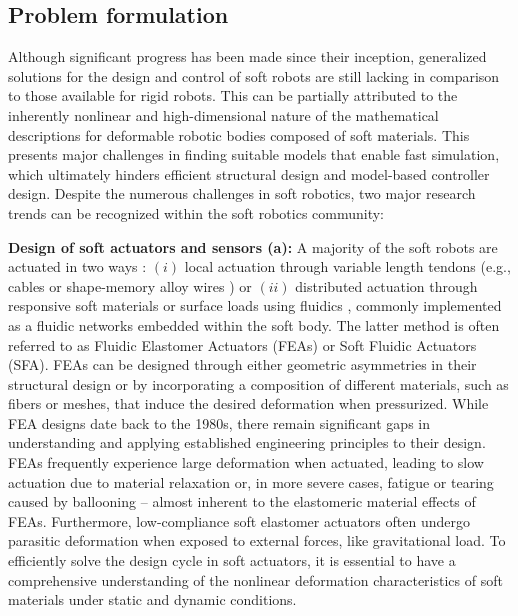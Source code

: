 \subsection{Problem formulation}
Although significant progress has been made since their inception, generalized solutions for the design and control of soft robots are still lacking in comparison to those available for rigid robots. This can be partially attributed to the inherently nonlinear and high-dimensional nature of the mathematical descriptions for deformable robotic bodies composed of soft materials. This presents major challenges in finding suitable models that enable fast simulation, which ultimately hinders efficient structural design and model-based controller design. Despite the numerous challenges in soft robotics, two major research trends can be recognized within the soft robotics community:

\textbf{Design of soft actuators and sensors (a):} A majority of the soft robots are actuated in two ways \cite{Rus2015}: $(i)$ local actuation through variable length tendons (e.g., cables \cite{Renda2018} or shape-memory alloy wires \cite{An2023Jan}) or $(ii)$ distributed actuation through responsive soft materials \cite{Vantomme2021} or surface loads using fluidics \cite{Fras2018Oct,Hawkes2017,Falkenhahn2015}, commonly implemented as a fluidic networks embedded within the soft body. The latter method is often referred to as Fluidic Elastomer Actuators (FEAs) or Soft Fluidic Actuators (SFA). FEAs can be designed through either geometric asymmetries in their structural design or by incorporating a composition of different materials, such as fibers or meshes, that induce the desired deformation when pressurized. While FEA designs date back to the 1980s, there remain significant gaps in understanding and applying established engineering principles to their design. FEAs frequently experience large deformation when actuated, leading to slow actuation due to material relaxation or, in more severe cases, fatigue or tearing caused by ballooning \cite{Marchese2015} -- almost inherent to the elastomeric material effects of FEAs. Furthermore, low-compliance soft elastomer actuators often undergo parasitic deformation when exposed to external forces, like gravitational load. To efficiently solve the design cycle in soft actuators, it is essential to have a comprehensive understanding of the nonlinear deformation characteristics of soft materials under static and dynamic conditions.

